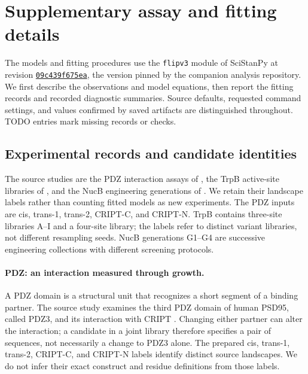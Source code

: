 \section{Supplementary assay and fitting details}
\label{app:fit-details}

The models and fitting procedures use the \texttt{flipv3} module of
SciStanPy at revision
\href{https://github.com/microsoft/SciStanPy/tree/09c439f675ead70f851d814242f153ecb7712113/flipv3}{\texttt{09c439f675ea}},
the version pinned by the companion analysis repository. We first describe
the observations and model equations, then report the fitting records and
recorded diagnostic summaries. Source defaults, requested command settings, and
values confirmed by saved artifacts are distinguished throughout. TODO
entries mark missing records or checks.

\subsection{Experimental records and candidate identities}
\label{app:experimental-records}

The source studies are the PDZ interaction assays of \citet{zarin2024}, the
TrpB active-site libraries of \citet{johnston2024}, and the NucB engineering
generations of \citet{thomas2025}. We retain their landscape labels rather
than counting fitted models as new experiments. The PDZ inputs
are cis, trans-1, trans-2, CRIPT-C, and CRIPT-N. TrpB contains three-site
libraries A--I and a four-site library; the labels refer to distinct variant
libraries, not different resampling seeds. NucB generations G1--G4 are
successive engineering collections with different screening protocols.

\paragraph{PDZ: an interaction measured through growth.}
A PDZ domain is a structural unit that recognizes a short segment of
a binding partner. The source study examines the third PDZ domain of
human PSD95, called PDZ3, and its interaction with CRIPT
\citep{zarin2024}. Changing either partner can alter the interaction;
a candidate in a joint library therefore specifies a pair of sequences,
not necessarily a change to PDZ3 alone. The prepared cis, trans-1,
trans-2, CRIPT-C, and CRIPT-N labels identify distinct source landscapes.
We do not infer their exact construct and residue definitions from
those labels.

